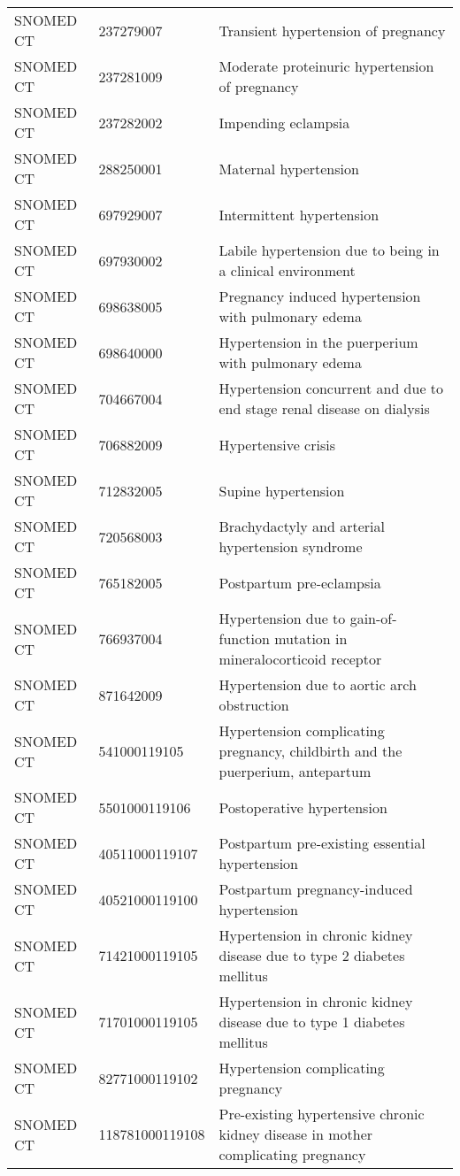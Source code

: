 \begin{longtable}{p{}p{}p{}}
  SNOMED CT & 237279007 & Transient hypertension of pregnancy \\ 
  SNOMED CT & 237281009 & Moderate proteinuric hypertension of pregnancy \\ 
  SNOMED CT & 237282002 & Impending eclampsia \\ 
  SNOMED CT & 288250001 & Maternal hypertension \\ 
  SNOMED CT & 697929007 & Intermittent hypertension \\ 
  SNOMED CT & 697930002 & Labile hypertension due to being in a clinical environment \\ 
  SNOMED CT & 698638005 & Pregnancy induced hypertension with pulmonary edema \\ 
  SNOMED CT & 698640000 & Hypertension in the puerperium with pulmonary edema \\ 
  SNOMED CT & 704667004 & Hypertension concurrent and due to end stage renal disease on dialysis \\ 
  SNOMED CT & 706882009 & Hypertensive crisis \\ 
  SNOMED CT & 712832005 & Supine hypertension \\ 
  SNOMED CT & 720568003 & Brachydactyly and arterial hypertension syndrome \\ 
  SNOMED CT & 765182005 & Postpartum pre-eclampsia \\ 
  SNOMED CT & 766937004 & Hypertension due to gain-of-function mutation in mineralocorticoid receptor \\ 
  SNOMED CT & 871642009 & Hypertension due to aortic arch obstruction \\ 
  SNOMED CT & 541000119105 & Hypertension complicating pregnancy, childbirth and the puerperium, antepartum \\ 
  SNOMED CT & 5501000119106 & Postoperative hypertension \\ 
  SNOMED CT & 40511000119107 & Postpartum pre-existing essential hypertension \\ 
  SNOMED CT & 40521000119100 & Postpartum pregnancy-induced hypertension \\ 
  SNOMED CT & 71421000119105 & Hypertension in chronic kidney disease due to type 2 diabetes mellitus \\ 
  SNOMED CT & 71701000119105 & Hypertension in chronic kidney disease due to type 1 diabetes mellitus \\ 
  SNOMED CT & 82771000119102 & Hypertension complicating pregnancy \\ 
  SNOMED CT & 118781000119108 & Pre-existing hypertensive chronic kidney disease in mother complicating pregnancy \\ 

\end{longtable}
